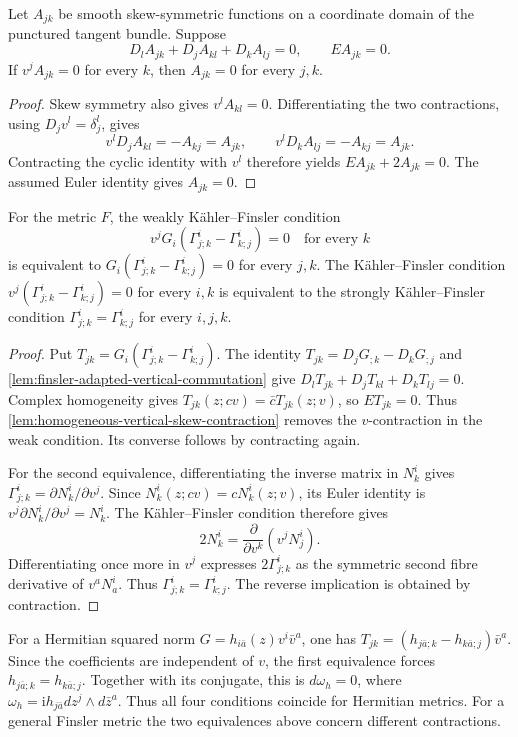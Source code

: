 \begin{lemma}\label{lem:homogeneous-vertical-skew-contraction}
Let $A_{jk}$ be smooth skew-symmetric functions on a coordinate domain of the punctured tangent bundle. Suppose
\[
 D_lA_{jk}+D_jA_{kl}+D_kA_{lj}=0,\qquad EA_{jk}=0.
\]
If $v^jA_{jk}=0$ for every $k$, then $A_{jk}=0$ for every $j,k$.
\end{lemma}
\begin{proof}
Skew symmetry also gives $v^lA_{kl}=0$. Differentiating the two contractions, using $D_jv^l=\delta_j^l$, gives
\[
 v^lD_jA_{kl}=-A_{kj}=A_{jk},\qquad
 v^lD_kA_{lj}=-A_{kj}=A_{jk}.
\]
Contracting the cyclic identity with $v^l$ therefore yields $EA_{jk}+2A_{jk}=0$. The assumed Euler identity gives $A_{jk}=0$.
\end{proof}

\begin{proposition}\label{prop:finsler-torsion-contraction-equivalences}
For the metric $F$, the weakly K\"ahler--Finsler condition
\[
 v^jG_i(\Gamma^i_{j;k}-\Gamma^i_{k;j})=0\quad\text{for every }k
\]
is equivalent to $G_i(\Gamma^i_{j;k}-\Gamma^i_{k;j})=0$ for every $j,k$. The K\"ahler--Finsler condition $v^j(\Gamma^i_{j;k}-\Gamma^i_{k;j})=0$ for every $i,k$ is equivalent to the strongly K\"ahler--Finsler condition $\Gamma^i_{j;k}=\Gamma^i_{k;j}$ for every $i,j,k$.
\end{proposition}
\begin{proof}
Put $T_{jk}=G_i(\Gamma^i_{j;k}-\Gamma^i_{k;j})$. The identity $T_{jk}=D_jG_{;k}-D_kG_{;j}$ and \cref{lem:finsler-adapted-vertical-commutation} give $D_lT_{jk}+D_jT_{kl}+D_kT_{lj}=0$. Complex homogeneity gives $T_{jk}(z;cv)=\bar cT_{jk}(z;v)$, so $ET_{jk}=0$. Thus \cref{lem:homogeneous-vertical-skew-contraction} removes the $v$-contraction in the weak condition. Its converse follows by contracting again.

For the second equivalence, differentiating the inverse matrix in $N^i_k$ gives $\Gamma^i_{j;k}=\partial N^i_k/\partial v^j$. Since $N^i_k(z;cv)=cN^i_k(z;v)$, its Euler identity is $v^j\partial N^i_k/\partial v^j=N^i_k$. The K\"ahler--Finsler condition therefore gives
\[
 2N^i_k=\frac{\partial}{\partial v^k}(v^jN^i_j).
\]
Differentiating once more in $v^j$ expresses $2\Gamma^i_{j;k}$ as the symmetric second fibre derivative of $v^aN^i_a$. Thus $\Gamma^i_{j;k}=\Gamma^i_{k;j}$. The reverse implication is obtained by contraction.
\end{proof}

For a Hermitian squared norm $G=h_{i\bar a}(z)v^i\bar v^a$, one has $T_{jk}=(h_{j\bar a;k}-h_{k\bar a;j})\bar v^a$. Since the coefficients are independent of $v$, the first equivalence forces $h_{j\bar a;k}=h_{k\bar a;j}$. Together with its conjugate, this is $d\omega_h=0$, where $\omega_h=\mathrm i h_{j\bar a}dz^j\wedge d\bar z^a$. Thus all four conditions coincide for Hermitian metrics. For a general Finsler metric the two equivalences above concern different contractions.
